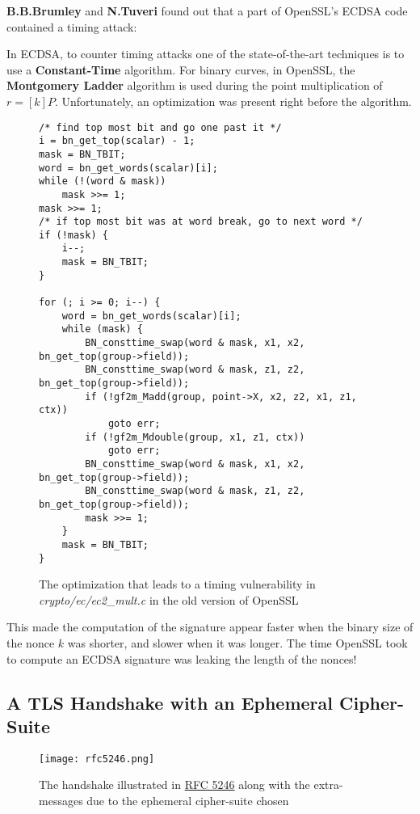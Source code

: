 \documentclass[a4paper,11pt]{article}
\begin{document}
\textbf{B.B.Brumley} and \textbf{N.Tuveri} found out\cite{brumley-tuveri} that a part of OpenSSL's ECDSA code contained a timing attack:

In ECDSA, to counter timing attacks one of the state-of-the-art techniques is to use a \textbf{Constant-Time} algorithm. For binary curves, in OpenSSL, the \textbf{Montgomery Ladder} algorithm is used during the point multiplication of $r = [k] P$. Unfortunately, an optimization was present right before the algorithm.

\begin{figure}[H]
\begin{verbatim}
/* find top most bit and go one past it */
i = bn_get_top(scalar) - 1;
mask = BN_TBIT;
word = bn_get_words(scalar)[i];
while (!(word & mask))
    mask >>= 1;
mask >>= 1;
/* if top most bit was at word break, go to next word */
if (!mask) {
    i--;
    mask = BN_TBIT;
}

for (; i >= 0; i--) {
    word = bn_get_words(scalar)[i];
    while (mask) {
        BN_consttime_swap(word & mask, x1, x2, bn_get_top(group->field));
        BN_consttime_swap(word & mask, z1, z2, bn_get_top(group->field));
        if (!gf2m_Madd(group, point->X, x2, z2, x1, z1, ctx))
            goto err;
        if (!gf2m_Mdouble(group, x1, z1, ctx))
            goto err;
        BN_consttime_swap(word & mask, x1, x2, bn_get_top(group->field));
        BN_consttime_swap(word & mask, z1, z2, bn_get_top(group->field));
        mask >>= 1;
    }
    mask = BN_TBIT;
}
\end{verbatim}
\caption{The optimization that leads to a timing vulnerability in \textit{crypto/ec/ec2\_mult.c} in the old version of OpenSSL}
\end{figure}

This made the computation of the signature appear faster when the binary size of the nonce $k$ was shorter, and slower when it was longer. The time OpenSSL took to compute an ECDSA signature was leaking the length of the nonces!

\subsection{A TLS Handshake with an Ephemeral Cipher-Suite}

\begin{figure}[H]
\texttt{[image: rfc5246.png]}
\caption{The handshake illustrated in \href{https://tools.ietf.org/html/rfc5246#section-7.3}{RFC 5246} along with the extra-messages due to the ephemeral cipher-suite chosen}
\end{figure}
\end{document}
